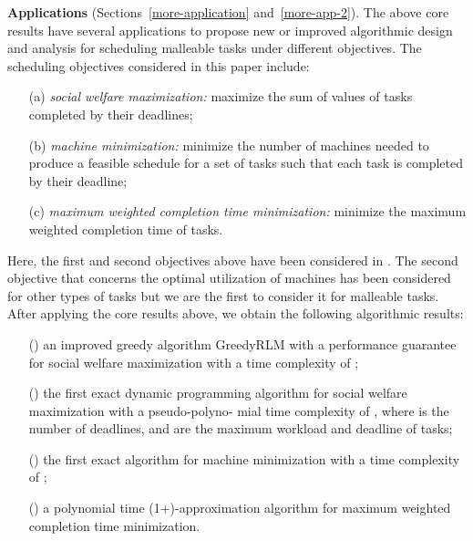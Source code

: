 \documentclass[10pt,journal,compsoc]{IEEEtran}
\newcommand{\rmnum}[1]{\romannumeral #1}
\begin{document}
\vspace{0.22em}\noindent\textbf{Applications} (Sections~\ref{more-application} and~\ref{more-app-2}). The above core results have several applications to propose new or improved algorithmic design and analysis for scheduling malleable tasks under different objectives. The scheduling objectives considered in this paper include:
\begin{enumerate}
\item [(a)] \textit{social welfare maximization:} maximize the sum of values of tasks completed by their deadlines;

\item [(b)] \textit{machine minimization:} minimize the number of machines needed to produce a feasible schedule for a set of tasks such that each task is completed by their deadline;

\item [(c)] \textit{maximum weighted completion time minimization:} minimize the maximum weighted completion time of tasks.
\end{enumerate}
Here, the first and second objectives above have been considered in \cite{Jain11a,Jain,Nagarajan}. The second objective that concerns the optimal utilization of machines has been considered for other types of tasks \cite{Chuzhoy04a} but we are the first to consider it for malleable tasks. After applying the core results above, we obtain the following algorithmic results:
\begin{itemize}
\item [(\rmnum{1})] an improved greedy algorithm GreedyRLM with a performance guarantee  for social welfare maximization with a time complexity of ;
\item [(\rmnum{2})] the first exact dynamic programming algorithm for social welfare maximization with a pseudo-polyno- mial time complexity of  , where  is the number of deadlines,  and  are the maximum workload and deadline of tasks;
\item [(\rmnum{3})] the first exact algorithm for machine minimization with a time complexity of ;
\item [(\rmnum{4})] a polynomial time (1+)-approximation algorithm for maximum weighted completion time minimization.
\end{itemize}
\end{document}
